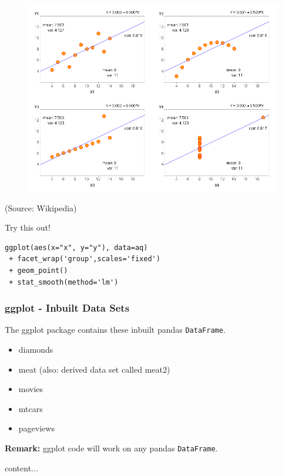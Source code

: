 \documentclass{beamer}
\begin{document}
\begin{frame}[fragile]

	\begin{figure}
		\centering
		\includegraphics[width=1.0\linewidth]{anscombe4}
	\end{figure}
(Source: Wikipedia)
\end{frame}
\begin{frame}[fragile]
\LARGE
Try this out!
\begin{framed}	\begin{verbatim}
ggplot(aes(x="x", y="y"), data=aq)
 + facet_wrap('group',scales='fixed') 
 + geom_point()
 + stat_smooth(method='lm')

	\end{verbatim}\end{framed}
\end{frame}

\begin{frame}
	\frametitle{ggplot - Inbuilt Data Sets}
	\Large
	The ggplot package contains these inbuilt  pandas \texttt{DataFrame}.
	\begin{itemize}
		\item diamonds
		\item meat  (also: derived data set called meat2)
		\item movies
		\item mtcars
		\item pageviews
	\end{itemize}
	\bigskip
	\noindent \textbf{Remark:}
	ggplot code will work on any pandas \texttt{DataFrame}. 
\end{frame}
\begin{frame}
	content...
\end{frame}
\end{document}
